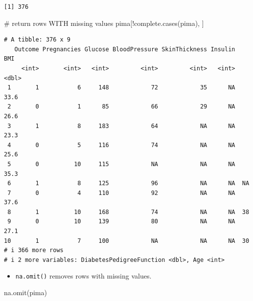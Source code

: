 \documentclass[
  letterpaper,
  DIV=11,
  numbers=noendperiod]{scrreprt}
\newenvironment{Shaded}{\begin{snugshade}}{\end{snugshade}}
\newcommand{\CommentTok}[1]{\textcolor[rgb]{0.37,0.37,0.37}{#1}}
\newcommand{\FunctionTok}[1]{\textcolor[rgb]{0.28,0.35,0.67}{#1}}
\newcommand{\NormalTok}[1]{\textcolor[rgb]{0.00,0.23,0.31}{#1}}
\newcommand{\SpecialCharTok}[1]{\textcolor[rgb]{0.37,0.37,0.37}{#1}}
\providecommand{\tightlist}{%
  \setlength{\itemsep}{0pt}\setlength{\parskip}{0pt}}\usepackage{longtable,booktabs,array}
\begin{document}
\begin{verbatim}
[1] 376
\end{verbatim}

\begin{Shaded}
\begin{Highlighting}[]
\CommentTok{\# return rows WITH missing values}
\NormalTok{pima[}\SpecialCharTok{!}\FunctionTok{complete.cases}\NormalTok{(pima), ]}
\end{Highlighting}
\end{Shaded}

\begin{verbatim}
# A tibble: 376 x 9
   Outcome Pregnancies Glucose BloodPressure SkinThickness Insulin   BMI
     <int>       <int>   <int>         <int>         <int>   <int> <dbl>
 1       1           6     148            72            35      NA  33.6
 2       0           1      85            66            29      NA  26.6
 3       1           8     183            64            NA      NA  23.3
 4       0           5     116            74            NA      NA  25.6
 5       0          10     115            NA            NA      NA  35.3
 6       1           8     125            96            NA      NA  NA  
 7       0           4     110            92            NA      NA  37.6
 8       1          10     168            74            NA      NA  38  
 9       0          10     139            80            NA      NA  27.1
10       1           7     100            NA            NA      NA  30  
# i 366 more rows
# i 2 more variables: DiabetesPedigreeFunction <dbl>, Age <int>
\end{verbatim}

\begin{itemize}
\tightlist
\item
  \texttt{na.omit()} removes rows with missing values.
\end{itemize}

\begin{Shaded}
\begin{Highlighting}[]
\FunctionTok{na.omit}\NormalTok{(pima)}
\end{Highlighting}
\end{Shaded}
\end{document}
